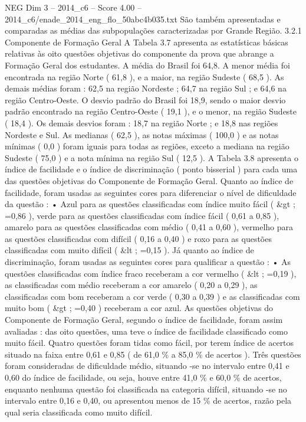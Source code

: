 \begin{textsample}{NEG Dim 3 – 2014\_c6 – Score 4.00 – 2014\_c6/enade\_2014\_eng\_flo\_50abc4b035.txt}
São também apresentadas e comparadas as médias das subpopulações caracterizadas por Grande Região. 3.2.1 Componente de Formação Geral A Tabela 3.7 apresenta as estatísticas básicas relativas às oito questões objetivas do componente da prova que abrange a Formação Geral dos estudantes.
A média do Brasil foi 64,8.
A menor média foi encontrada na região Norte ( 61,8 ), e a maior, na região Sudeste ( 68,5 ).
As demais médias foram : 62,5 na região Nordeste ; 64,7 na região Sul ; e 64,6 na região Centro-Oeste.
O desvio padrão do Brasil foi 18,9, sendo o maior desvio padrão encontrado na região Centro-Oeste ( 19,1 ), e o menor, na região Sudeste ( 18,4 ).
Os demais desvios foram : 18,7 na região Norte ; e 18,8 nas regiões Nordeste e Sul.
As medianas ( 62,5 ), as notas máximas ( 100,0 ) e as notas mínimas ( 0,0 ) foram iguais para todas as regiões, exceto a mediana na região Sudeste ( 75,0 ) e a nota mínima na região Sul ( 12,5 ).
A Tabela 3.8 apresenta o índice de facilidade e o índice de discriminação ( ponto bisserial ) para cada uma das questões objetivas do Componente de Formação Geral.
Quanto ao índice de facilidade, foram usadas as seguintes cores para diferenciar o nível de dificuldade da questão : • Azul para as questões classificadas com índice muito fácil ( \&gt ; =0,86 ), verde para as questões classificadas com índice fácil ( 0,61 a 0,85 ), amarelo para as questões classificadas com médio ( 0,41 a 0,60 ), vermelho para as questões classificadas com difícil ( 0,16 a 0,40 ) e roxo para as questões classificadas com muito difícil ( \&lt ; =0,15 ).
Já quanto ao índice de discriminação, foram usadas as seguintes cores para qualificar a questão : • As questões classificadas com índice fraco receberam a cor vermelho ( \&lt ; =0,19 ), as classificadas com médio receberam a cor amarelo ( 0,20 a 0,29 ), as classificadas com bom receberam a cor verde ( 0,30 a 0,39 ) e as classificadas com muito bom ( \&gt ; =0,40 ) receberam a cor azul.
As questões objetivas do Componente de Formação Geral, segundo o índice de facilidade, foram assim avaliadas : das oito questões, uma teve o índice de facilidade classificado como muito fácil.
Quatro questões foram tidas como fácil, por terem índice de acertos situado na faixa entre 0,61 e 0,85 ( de 61,0 \% a 85,0 \% de acertos ).
Três questões foram consideradas de dificuldade médio, situando -se no intervalo entre 0,41 e 0,60 do índice de facilidade, ou seja, houve entre 41,0 \% e 60,0 \% de acertos, enquanto nenhuma questão foi classificada na categoria difícil, situando -se no intervalo entre 0,16 e 0,40, ou apresentou menos de 15 \% de acertos, razão pela qual seria classificada como muito difícil.

\end{textsample}
